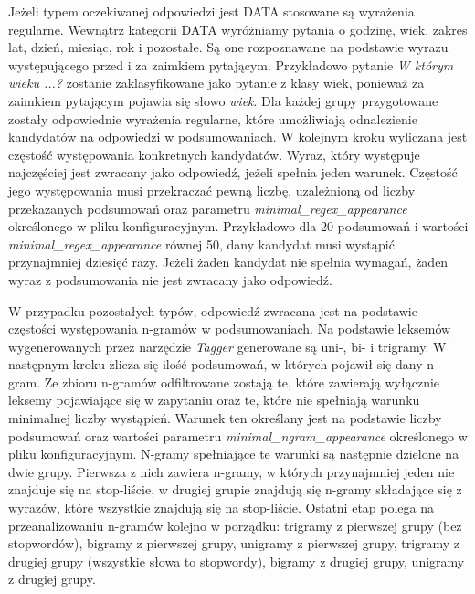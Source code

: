 Jeżeli typem oczekiwanej odpowiedzi jest DATA stosowane są wyrażenia regularne. Wewnątrz kategorii DATA wyróżniamy pytania o godzinę, wiek, zakres lat, dzień, miesiąc, rok i pozostałe. Są one rozpoznawane na podstawie wyrazu występującego przed i za zaimkiem pytającym. Przykładowo pytanie \emph{W którym wieku ...?} zostanie zaklasyfikowane jako pytanie z klasy wiek, ponieważ za zaimkiem pytającym pojawia się słowo \emph{wiek}. Dla każdej grupy przygotowane zostały odpowiednie wyrażenia regularne, które umożliwiają odnalezienie kandydatów na odpowiedzi w podsumowaniach. W kolejnym kroku wyliczana jest częstość występowania konkretnych kandydatów. Wyraz, który występuje najczęściej jest zwracany jako odpowiedź, jeżeli spełnia jeden warunek. Częstość jego występowania musi przekraczać pewną liczbę, uzależnioną od liczby przekazanych podsumowań oraz parametru \emph{minimal\_regex\_appearance} określonego w pliku konfiguracyjnym. Przykładowo dla 20 podsumowań i wartości \emph{minimal\_regex\_appearance} równej 50, dany kandydat musi wystąpić przynajmniej dziesięć razy. Jeżeli żaden kandydat nie spełnia wymagań, żaden wyraz z podsumowania nie jest zwracany jako odpowiedź. 

W przypadku pozostałych typów, odpowiedź zwracana jest na podstawie częstości występowania n-gramów w podsumowaniach. Na podstawie leksemów wygenerowanych przez narzędzie \emph{Tagger} generowane są uni-, bi- i trigramy. W następnym kroku zlicza się ilość podsumowań, w których pojawił się dany n-gram. Ze zbioru n-gramów odfiltrowane zostają te, które zawierają wyłącznie leksemy pojawiające się w zapytaniu oraz te, które nie spełniają warunku minimalnej liczby wystąpień. Warunek ten określany jest na podstawie liczby podsumowań oraz wartości parametru \emph{minimal\_ngram\_appearance} określonego w pliku konfiguracyjnym. N-gramy spełniające te warunki są następnie dzielone na dwie grupy. Pierwsza z nich zawiera n-gramy, w których przynajmniej jeden nie znajduje się na stop-liście, w drugiej grupie znajdują się n-gramy składające się z wyrazów, które wszystkie znajdują się na stop-liście. Ostatni etap polega na przeanalizowaniu n-gramów kolejno w porządku: trigramy z pierwszej grupy (bez stopwordów), bigramy z pierwszej grupy, unigramy z pierwszej grupy, trigramy z drugiej grupy (wszystkie słowa to stopwordy), bigramy z drugiej grupy, unigramy z drugiej grupy. 

